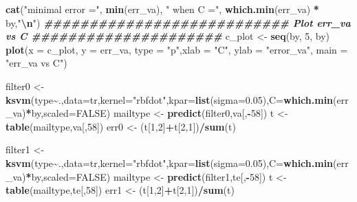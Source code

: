 \documentclass[
]{article}
\newenvironment{Shaded}{\begin{snugshade}}{\end{snugshade}}
\newcommand{\AttributeTok}[1]{\textcolor[rgb]{0.13,0.29,0.53}{#1}}
\newcommand{\ConstantTok}[1]{\textcolor[rgb]{0.56,0.35,0.01}{#1}}
\newcommand{\DecValTok}[1]{\textcolor[rgb]{0.00,0.00,0.81}{#1}}
\newcommand{\DocumentationTok}[1]{\textcolor[rgb]{0.56,0.35,0.01}{\textbf{\textit{#1}}}}
\newcommand{\FloatTok}[1]{\textcolor[rgb]{0.00,0.00,0.81}{#1}}
\newcommand{\FunctionTok}[1]{\textcolor[rgb]{0.13,0.29,0.53}{\textbf{#1}}}
\newcommand{\NormalTok}[1]{#1}
\newcommand{\OtherTok}[1]{\textcolor[rgb]{0.56,0.35,0.01}{#1}}
\newcommand{\SpecialCharTok}[1]{\textcolor[rgb]{0.81,0.36,0.00}{\textbf{#1}}}
\newcommand{\StringTok}[1]{\textcolor[rgb]{0.31,0.60,0.02}{#1}}
\begin{document}
\begin{Shaded}
\begin{Highlighting}[]
\FunctionTok{cat}\NormalTok{(}\StringTok{"minimal error ="}\NormalTok{, }\FunctionTok{min}\NormalTok{(err\_va), }\StringTok{" when C ="}\NormalTok{, }\FunctionTok{which.min}\NormalTok{(err\_va) }\SpecialCharTok{*}\NormalTok{ by,}\StringTok{"}\SpecialCharTok{\textbackslash{}n}\StringTok{"}\NormalTok{)}
\DocumentationTok{\#\#\#\#\#\#\#\#\#\#\#\#\#\#\#\#\#\#\#\#\#\#\#\#\#\#\#  Plot err\_va vs C \#\#\#\#\#\#\#\#\#\#\#\#\#\#\#\#\#\#\#\#\#}
\NormalTok{c\_plot }\OtherTok{\textless{}{-}} \FunctionTok{seq}\NormalTok{(by, }\DecValTok{5}\NormalTok{, by)}
\FunctionTok{plot}\NormalTok{(}\AttributeTok{x =}\NormalTok{ c\_plot, }\AttributeTok{y =}\NormalTok{ err\_va, }\AttributeTok{type =} \StringTok{"p"}\NormalTok{,}\AttributeTok{xlab =} \StringTok{"C"}\NormalTok{, }\AttributeTok{ylab =} \StringTok{"error\_va"}\NormalTok{, }\AttributeTok{main =} \StringTok{"err\_va vs C"}\NormalTok{)}

\NormalTok{filter0 }\OtherTok{\textless{}{-}} \FunctionTok{ksvm}\NormalTok{(type}\SpecialCharTok{\textasciitilde{}}\NormalTok{.,}\AttributeTok{data=}\NormalTok{tr,}\AttributeTok{kernel=}\StringTok{"rbfdot"}\NormalTok{,}\AttributeTok{kpar=}\FunctionTok{list}\NormalTok{(}\AttributeTok{sigma=}\FloatTok{0.05}\NormalTok{),}\AttributeTok{C=}\FunctionTok{which.min}\NormalTok{(err\_va)}\SpecialCharTok{*}\NormalTok{by,}\AttributeTok{scaled=}\ConstantTok{FALSE}\NormalTok{)}
\NormalTok{mailtype }\OtherTok{\textless{}{-}} \FunctionTok{predict}\NormalTok{(filter0,va[,}\SpecialCharTok{{-}}\DecValTok{58}\NormalTok{])}
\NormalTok{t }\OtherTok{\textless{}{-}} \FunctionTok{table}\NormalTok{(mailtype,va[,}\DecValTok{58}\NormalTok{])}
\NormalTok{err0 }\OtherTok{\textless{}{-}}\NormalTok{ (t[}\DecValTok{1}\NormalTok{,}\DecValTok{2}\NormalTok{]}\SpecialCharTok{+}\NormalTok{t[}\DecValTok{2}\NormalTok{,}\DecValTok{1}\NormalTok{])}\SpecialCharTok{/}\FunctionTok{sum}\NormalTok{(t)}

\NormalTok{filter1 }\OtherTok{\textless{}{-}} \FunctionTok{ksvm}\NormalTok{(type}\SpecialCharTok{\textasciitilde{}}\NormalTok{.,}\AttributeTok{data=}\NormalTok{tr,}\AttributeTok{kernel=}\StringTok{"rbfdot"}\NormalTok{,}\AttributeTok{kpar=}\FunctionTok{list}\NormalTok{(}\AttributeTok{sigma=}\FloatTok{0.05}\NormalTok{),}\AttributeTok{C=}\FunctionTok{which.min}\NormalTok{(err\_va)}\SpecialCharTok{*}\NormalTok{by,}\AttributeTok{scaled=}\ConstantTok{FALSE}\NormalTok{)}
\NormalTok{mailtype }\OtherTok{\textless{}{-}} \FunctionTok{predict}\NormalTok{(filter1,te[,}\SpecialCharTok{{-}}\DecValTok{58}\NormalTok{])}
\NormalTok{t }\OtherTok{\textless{}{-}} \FunctionTok{table}\NormalTok{(mailtype,te[,}\DecValTok{58}\NormalTok{])}
\NormalTok{err1 }\OtherTok{\textless{}{-}}\NormalTok{ (t[}\DecValTok{1}\NormalTok{,}\DecValTok{2}\NormalTok{]}\SpecialCharTok{+}\NormalTok{t[}\DecValTok{2}\NormalTok{,}\DecValTok{1}\NormalTok{])}\SpecialCharTok{/}\FunctionTok{sum}\NormalTok{(t)}


\end{Highlighting}
\end{Shaded}
\end{document}
